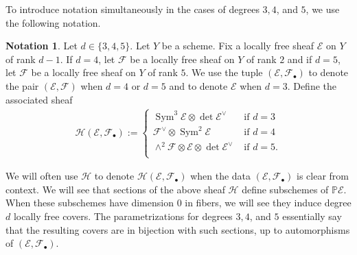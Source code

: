 \documentclass[12 pt]{amsart}
\newcommand{\rboxed}[1]{#1}
\theoremstyle{plain}
\theoremstyle{definition}
\newtheorem{notation}[theorem]{Notation}
\theoremstyle{remark}
\numberwithin{equation}{section}
\newcommand\bp{\mathbb P}
\newcommand\bz{\mathbb Z}
\newcommand\sce{\mathscr E}
\newcommand\scf{\mathscr F}
\newcommand\sch{\mathscr H}
\DeclareMathOperator\spec{\operatorname{Spec}}
\newcommand\coverstack[1]{\mathrm{Covers}_{d}} %
\DeclareMathOperator\hilb{Hilb}
\DeclareMathOperator\sym{Sym}
\DeclareMathOperator\pgl{PGL}
\begin{document}
%

To introduce notation simultaneously in the cases of degrees $3,4$, and $5$,
we use the following notation.
\begin{notation}
	\label{notation:h-sheaf}
	Let $d \in \{ 3, 4, 5\}$.  Let $Y$ be a scheme. 
	Fix a locally free sheaf $\sce$ on $Y$ of rank $d-1$. 
	If $d = 4$, let $\scf$ be a locally free sheaf on $Y$ of rank $2$ and if $d
	= 5$, let $\scf$ be a locally free sheaf on $Y$ of rank $5$.  
	We use the tuple $(\sce, \scf_\bullet)$ to denote the pair
	$(\sce,\scf)$ when $d = 4$ or $d = 5$ and to denote $\sce$ when $d = 3$.
	Define the associated sheaf
	\begin{align}
	\label{equation:associate-h} 
	\rboxed{\sch(\sce, \scf_\bullet)} :=
	\begin{cases} \sym^3 \sce \otimes \det \sce^\vee & \text{ if } d=3 \\
		\scf^\vee \otimes \sym^2 \sce  & \text{ if } d=4 \\ \wedge^2
\scf \otimes \sce \otimes \det \sce^\vee & \text{ if } d=5. \\ \end{cases}
\end{align}
\end{notation}

We will often use $\sch$ to denote $\sch(\sce, \scf_\bullet)$ when the data
$(\sce,\scf_\bullet)$ is clear from context.
We will see that sections of the above sheaf $\sch$ define subschemes of $\bp
\sce$. 
When these subschemes have dimension $0$ in fibers, we
will see they induce
degree $d$ locally free covers.
The parametrizations for degrees $3,4$, and $5$ essentially say that the
resulting covers are in bijection with such sections, up to automorphisms of
$(\sce, \scf_\bullet)$.
\end{document}
